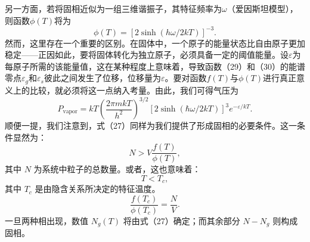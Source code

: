 另一方面，若将固相近似为一组三维谐振子，其特征频率为\(\omega\)（爱因斯坦模型），则函数\(\phi(T)\)将为
\begin{equation}\tag{4.4.35}\label{eq:4.4.35}
\phi ( T ) = [ 2 \sinh ( h \omega / 2 k T ) ] ^{- 3} .
\end{equation}
然而，这里存在一个重要的区别。在固体中，一个原子的能量状态比自由原子更加稳定——正因如此，要将固体转化为独立原子，必须具备一定的阈值能量。设\(\varepsilon\)为每原子所需的该能量值，这在某种程度上意味着，导致函数（29）和（30）的能谱零点\(\varepsilon_{g}\)和\(\varepsilon_{s}\)彼此之间发生了位移，位移量为\(\varepsilon\)。要对函数\(f(T)\)与\(\phi(T)\)进行真正意义上的比较，就必须将这一点纳入考量。由此，我们可得气压为
\begin{equation}\tag{4.4.36}\label{eq:4.4.36}
P _ { \mathrm { v a p o r } } = k T \left( \frac { 2 \pi m k T } { h ^{2} } \right) ^{3 / 2} [ 2 \sinh ( \hbar \omega / 2 k T ) ] ^{3} e ^{- \varepsilon / k T} .
\end{equation}
顺便一提，我们注意到，式（27）同样为我们提供了形成固相的必要条件。这一条件显然为：
\begin{equation}\tag{4.4.37}\label{eq:4.4.37}
N > V { \frac { f ( T ) } { \phi ( T ) } } ,
\end{equation}
其中 \(N\) 为系统中粒子的总数量。或者，这也意味着：
\begin{equation}\tag{4.4.38}\label{eq:4.4.38}
T < T _ { c } ,
\end{equation}
其中 \(T_{c}\) 是由隐含关系所决定的特征温度。
\begin{equation}\tag{4.4.39}\label{eq:4.4.39}
\frac { f ( T _ { c } ) } { \phi ( T _ { c } ) } = \frac { N } { V } .
\end{equation}
一旦两种相出现，数值 \(N_{g}(T)\) 将由式（27）确定；而其余部分 \(N - N_{g}\) 则构成固相。
